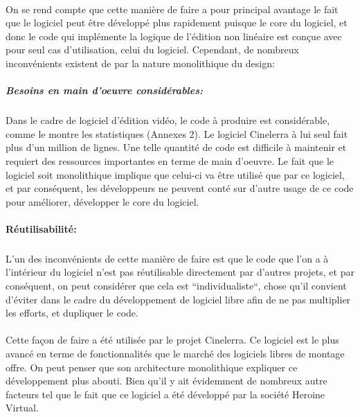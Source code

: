 \paragraph{}
On se rend compte que cette manière de faire a pour
principal avantage le fait que le logiciel peut être développé plus
rapidement puisque le core du logiciel, et donc le code qui implémente
la logique de l'édition non linéaire est conçue avec pour seul cas
d'utilisation, celui du logiciel. Cependant, de
nombreux inconvénients existent de par la nature monolithique du design:

\subparagraph{Besoins en main d'oeuvre considérables:}
\subparagraph { }
Dans le cadre de logiciel d'édition vidéo, le code à produire est considérable,
comme le montre les statistiques (Annexes 2). Le logiciel Cinelerra à lui
seul fait plus d'un million de lignes. Une telle quantité de code est
difficile à maintenir et requiert des ressources importantes en terme
de main d'oeuvre. Le fait que le logiciel soit monolithique implique que
celui-ci va être utilisé que par ce logiciel, et par conséquent, les
développeurs ne peuvent conté sur d'autre usage de ce code pour améliorer,
développer le core du logiciel.

\paragraph{Réutilisabilité:}
\subparagraph { }
L'un des inconvénients de cette manière de faire est que
le code que l'on a à l'intérieur du logiciel n'est pas réutilisable
directement par d'autres projets, et par conséquent, on peut considérer
que cela est ``individualiste``, chose qu'il convient d'éviter dans le
cadre du développement de logiciel libre afin de ne pas multiplier les
efforts, et dupliquer le code.

\paragraph{}
Cette façon de faire a été utilisée par le projet
Cinelerra. Ce logiciel est le plus avancé en terme de fonctionnalités
que le marché des logiciels libres de montage offre. On peut
penser que son architecture monolithique expliquer ce développement
plus abouti. Bien qu'il y ait évidemment de nombreux autre facteurs tel
que le fait que ce logiciel a été développé par la société Heroine Virtual.

